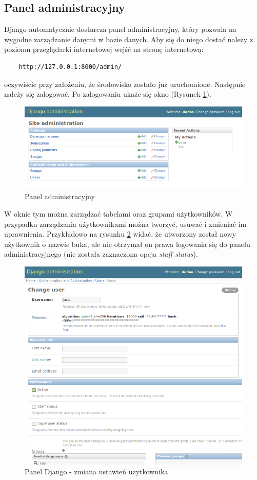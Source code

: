 \subsection{Panel administracyjny}
Django automatycznie dostarcza panel administracyjny, który pozwala na wygodne zarządzanie danymi w bazie danych. Aby się do niego dostać należy z poziomu przeglądarki internetowej wejść na stronę internetową:
\begin{verbatim}
	http://127.0.0.1:8000/admin/
\end{verbatim}
oczywiście przy założeniu, że środowisko zostało już uruchomione. Następnie należy się zalogować. Po zalogowaniu ukaże się okno (Rysunek \ref{fig:panelAdmin}).
\begin{figure}[p]
	\centering
	\includegraphics[width=\linewidth]{003}
	\caption{Panel administracyjny}
	\label{fig:panelAdmin}
	\end{figure}
\newline
W oknie tym można zarządzać tabelami oraz grupami użytkowników. 
W przypadku zarządzania użytkownikami można tworzyć, usuwać i zmieniać im uprawnienia. Przykładowo na rysunku \ref{fig:panelUzytkownicy} widać, że utworzony został nowy użytkownik o nazwie buka, ale nie otrzymał on prawa logowania się do panelu administracyjnego (nie została zaznaczona opcja \textit{staff status}). 
\begin{figure}[p]
	\centering
	\includegraphics[width=\linewidth]{005}
	\caption{Panel Django - zmiana ustawień użytkownika}
	\label{fig:panelUzytkownicy}
	\end{figure}
